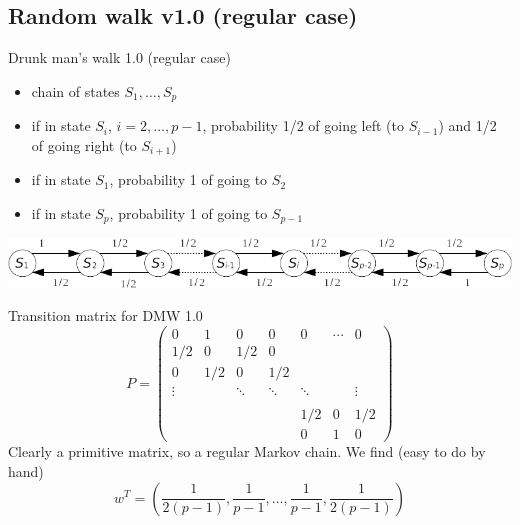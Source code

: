 \documentclass[aspectratio=43]{beamer}
\begin{document}
\subsection{Random walk v1.0 (regular case)}

\begin{frame}{Drunk man's walk 1.0 (regular case)}
    \begin{itemize}
        \item chain of states $S_1,\ldots,S_p$
        \item if in state $S_i$, $i=2,\ldots,p-1$, probability 1/2 of going left (to $S_{i-1}$) and 1/2 of going right (to $S_{i+1}$)
        \item if in state $S_1$, probability 1 of going to $S_2$
        \item if in state $S_p$, probability 1 of going to $S_{p-1}$
    \end{itemize}
\vfill
\begin{center}
    \includegraphics[width=\textwidth]{FIGS/drunk_mans_walk_regular}
\end{center}
\end{frame}


\begin{frame}{Transition matrix for DMW 1.0}
    $$
    P=\begin{pmatrix}
    0 & 1 & 0 & 0 & 0 & \cdots & 0\\
    1/2 & 0 & 1/2 & 0 & & & \\
    0 & 1/2 & 0 & 1/2 & & & \\
    \vdots & & \ddots & \ddots & \ddots & & \vdots \\
    & & & & & & \\
    & & & & 1/2 & 0 & 1/2 \\
    & & & & 0 & 1 & 0
    \end{pmatrix}
    $$
    Clearly a primitive matrix, so a regular Markov chain. We find (easy to do by hand)
    $$
    w^T=\left(\frac{1}{2(p-1)},\frac{1}{p-1},\ldots,\frac{1}{p-1},\frac{1}{2(p-1)}\right)
    $$    
\end{frame}

\end{document}

